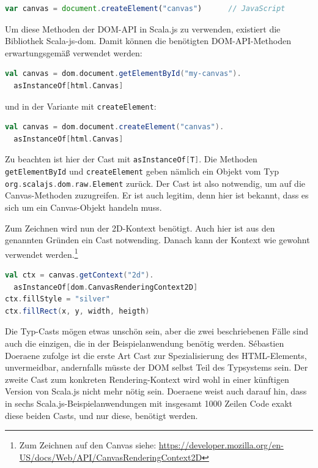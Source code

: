 \documentclass[a4paper, 12pt, hidelinks, listof=totoc, listoftables=totoc, bibliography=totoc]{scrreprt}
\newcommand{\scala}[1]{\lstinline[language=Scala, style=inline]|#1|}
\begin{document}
\begin{lstlisting}[language=JavaScript, style=snippet]
var canvas = document.createElement("canvas")      // JavaScript
\end{lstlisting}

Um diese Methoden der \ac{DOM}-\ac{API} in Scala.js zu verwenden, existiert die Bibliothek Scala-js-dom. Damit können die benötigten \ac{DOM}-\ac{API}-Methoden erwartungsgemäß verwendet werden:

\begin{lstlisting}[language=Scala, style=snippet]
val canvas = dom.document.getElementById("my-canvas").
  asInstanceOf[html.Canvas]
\end{lstlisting}

und in der Variante mit \scala{createElement}:

\begin{lstlisting}[language=Scala, style=snippet]
val canvas = dom.document.createElement("canvas").
  asInstanceOf[html.Canvas]
\end{lstlisting}

Zu beachten ist hier der Cast mit \scala{asInstanceOf[T]}. Die Methoden \scala{getElementById} und \scala{createElement}
geben nämlich ein Objekt vom Typ \scala{org.scalajs.dom.raw.Element} zurück. Der Cast ist also notwendig, um auf die Canvas-Methoden zuzugreifen. Er ist auch legitim, denn hier ist bekannt, dass es sich um ein Canvas-Objekt handeln muss.

Zum Zeichnen wird nun der 2D-Kontext benötigt. Auch hier ist aus den genannten Gründen ein Cast notwending. Danach kann der Kontext wie gewohnt verwendet werden.\footnote{Zum Zeichnen auf den Canvas siehe: \url{https://developer.mozilla.org/en-US/docs/Web/API/CanvasRenderingContext2D}}

\begin{lstlisting}[language=Scala, style=snippet]
val ctx = canvas.getContext("2d").
  asInstanceOf[dom.CanvasRenderingContext2D]
ctx.fillStyle = "silver"
ctx.fillRect(x, y, width, heigth)
\end{lstlisting}

Die Typ-Casts mögen etwas unschön sein, aber die zwei beschriebenen Fälle sind auch die einzigen, die in der Beispielanwendung benötig werden. Sébastien Doeraene zufolge ist die erste Art Cast zur Spezialisierung des \ac{HTML}-Elements, unvermeidbar, andernfalls müsste der \ac{DOM} selbst Teil des Typsystems sein. Der zweite Cast zum konkreten Rendering-Kontext wird wohl in einer künftigen Version von Scala.js nicht mehr nötig sein. Doeraene weist auch darauf hin, dass in sechs Scala.js-Beispielanwendungen mit insgesamt 1000 Zeilen Code exakt diese beiden Casts, und nur diese, benötigt werden. \cite[S. 8]{doeraene2013.TDI}
\end{document}
